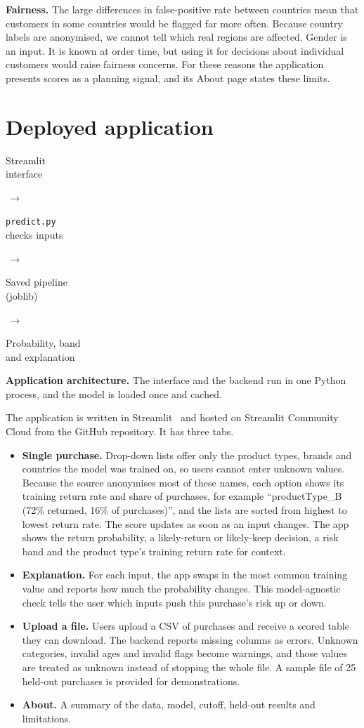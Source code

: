 \documentclass[11pt,a4paper]{article}
\newcommand{\stage}[1]{\colorbox{wash}{\parbox[c][14mm][c]{.20\linewidth}{\centering\small #1}}}
\begin{document}
\textbf{Fairness.} The large differences in false-positive rate between countries mean that customers in some countries would be flagged far more often. Because country labels are anonymised, we cannot tell which real regions are affected. Gender is an input. It is known at order time, but using it for decisions about individual customers would raise fairness concerns. For these reasons the application presents scores as a planning signal, and its About page states these limits.

\section{Deployed application}
\begin{center}
\stage{Streamlit\\interface}\(\,\to\,\)\stage{\texttt{predict.py}\\checks inputs}\(\,\to\,\)\stage{Saved pipeline\\(joblib)}\(\,\to\,\)\stage{Probability, band\\and explanation}
\end{center}
{\small\textbf{Application architecture.} The interface and the backend run in one Python process, and the model is loaded once and cached.}

The application is written in Streamlit~\cite{streamlit} and hosted on Streamlit Community Cloud from the GitHub repository. It has three tabs.

\begin{itemize}
\item \textbf{Single purchase.} Drop-down lists offer only the product types, brands and countries the model was trained on, so users cannot enter unknown values. Because the source anonymises most of these names, each option shows its training return rate and share of purchases, for example ``productType\_B (72\% returned, 16\% of purchases)'', and the lists are sorted from highest to lowest return rate. The score updates as soon as an input changes. The app shows the return probability, a likely-return or likely-keep decision, a risk band and the product type's training return rate for context.
\item \textbf{Explanation.} For each input, the app swaps in the most common training value and reports how much the probability changes. This model-agnostic check tells the user which inputs push this purchase's risk up or down.
\item \textbf{Upload a file.} Users upload a CSV of purchases and receive a scored table they can download. The backend reports missing columns as errors. Unknown categories, invalid ages and invalid flags become warnings, and those values are treated as unknown instead of stopping the whole file. A sample file of 25 held-out purchases is provided for demonstrations.
\item \textbf{About.} A summary of the data, model, cutoff, held-out results and limitations.
\end{itemize}
\end{document}
